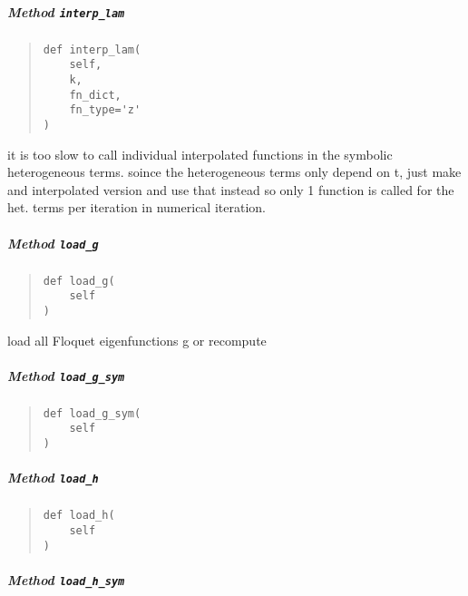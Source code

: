 \documentclass[english,a4paper,oneside]{article}
\let\oldsubparagraph\subparagraph
\renewcommand{\subparagraph}[1]{\oldsubparagraph{#1}\mbox{}}
\begin{document}
\hypertarget{StrongCoupling.StrongCoupling.interp_lam}{%
\subparagraph{\texorpdfstring{Method
\texttt{interp\_lam}}{Method interp\_lam}}\label{StrongCoupling.StrongCoupling.interp_lam}}

\begin{quote}
\begin{verbatim}
def interp_lam(
    self,
    k,
    fn_dict,
    fn_type='z'
)
\end{verbatim}
\end{quote}

it is too slow to call individual interpolated functions in the symbolic
heterogeneous terms. soince the heterogeneous terms only depend on t,
just make and interpolated version and use that instead so only 1
function is called for the het. terms per iteration in numerical
iteration.

\hypertarget{StrongCoupling.StrongCoupling.load_g}{%
\subparagraph{\texorpdfstring{Method
\texttt{load\_g}}{Method load\_g}}\label{StrongCoupling.StrongCoupling.load_g}}

\begin{quote}
\begin{verbatim}
def load_g(
    self
)
\end{verbatim}
\end{quote}

load all Floquet eigenfunctions g or recompute

\hypertarget{StrongCoupling.StrongCoupling.load_g_sym}{%
\subparagraph{\texorpdfstring{Method
\texttt{load\_g\_sym}}{Method load\_g\_sym}}\label{StrongCoupling.StrongCoupling.load_g_sym}}

\begin{quote}
\begin{verbatim}
def load_g_sym(
    self
)
\end{verbatim}
\end{quote}

\hypertarget{StrongCoupling.StrongCoupling.load_h}{%
\subparagraph{\texorpdfstring{Method
\texttt{load\_h}}{Method load\_h}}\label{StrongCoupling.StrongCoupling.load_h}}

\begin{quote}
\begin{verbatim}
def load_h(
    self
)
\end{verbatim}
\end{quote}

\hypertarget{StrongCoupling.StrongCoupling.load_h_sym}{%
\subparagraph{\texorpdfstring{Method
\texttt{load\_h\_sym}}{Method load\_h\_sym}}\label{StrongCoupling.StrongCoupling.load_h_sym}}
\end{document}
